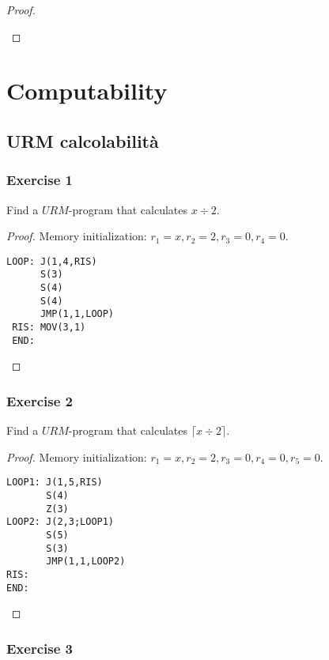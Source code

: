 \documentclass[12pt,a4paper,oneside]{book}
\begin{document}
\begin{exercise}
\begin{proof}
\begin{itemize}
        \end{itemize}
    \end{proof}
\end{exercise}


\chapter{Computability}

\section{URM calcolabilità}

\subsection{Exercise 1}

\begin{exercise}
	Find a $URM$-program that calculates $x \div 2$.
	
	\begin{proof}
		Memory initialization: $r_1 = x, r_2 = 2, r_3 = 0, r_4 = 0$.
		
\begin{verbatim}
LOOP: J(1,4,RIS)
      S(3)
      S(4)
      S(4)
      JMP(1,1,LOOP)
 RIS: MOV(3,1)
 END:
\end{verbatim}
	\end{proof}
\end{exercise}

\subsection{Exercise 2}

\begin{exercise}
	Find a $URM$-program that calculates $\lceil x \div 2 \rceil$.
	
	\begin{proof}
		Memory initialization: $r_1 = x, r_2 = 2, r_3 = 0, r_4 = 0, r_5 = 0$.
		
\begin{verbatim}
LOOP1: J(1,5,RIS)
       S(4)
       Z(3)
LOOP2: J(2,3;LOOP1)
       S(5)
       S(3)
       JMP(1,1,LOOP2)
RIS:
END:
\end{verbatim}
	\end{proof}
\end{exercise}

\subsection{Exercise 3}
\end{document}
